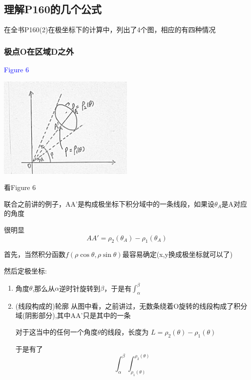 \documentclass[a4paper]{ctexart}
\begin{document}
\begin{multicols}{2}
\subsection{理解P160的几个公式}
\par 在全书P160(2)在极坐标下的计算中，列出了4个图，相应的有四种情况

\subsubsection{极点O在区域D之外}
\textcolor{blue}{Figure 6}
\begin{center}
\includegraphics[height=5cm]{lecture7/Figure6.jpg}
\end{center}
\par 看Figure 6
\par 联合之前讲的例子，AA'是构成极坐标下积分域中的一条线段，如果设$\theta_A$是A对应的角度
\par 很明显
\begin{equation}
AA' = \rho_2(\theta_A) - \rho_1(\theta_A)
\end{equation}
\par 首先，当然积分函数$f(\rho\cos{\theta}, \rho\sin{\theta})$最容易确定(x,y换成极坐标就可以了)
\par 然后定极坐标:
\begin{enumerate}
    \item 角度$\theta$,那么从$\alpha$逆时针旋转到$\beta$，于是有$\int_{\alpha}^{\beta}$
    \item (线段构成的)轮廓 从图中看，之前讲过，无数条绕着O旋转的线段构成了积分域(阴影部分),其中AA'只是其中的一条
    \par 对于这当中的任何一个角度$\theta$的线段，长度为 $L = \rho_2(\theta) - \rho_1(\theta)$
    \par 于是有了
    \begin{equation}
        \int_{\alpha}^{\beta}\int_{\rho_1(\theta)}^{\rho_2(\theta)}
    \end{equation}
\end{enumerate}


\end{multicols}
\end{document}
